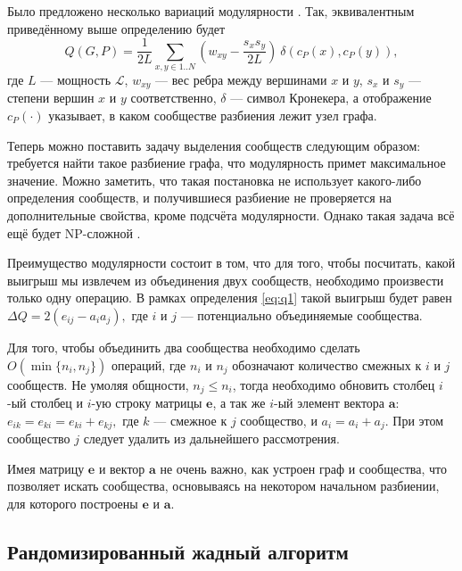 Было предложено несколько вариаций модулярности \cite{Muff&Rao&Caflisch:2005, Fortunato&Barthelemy:2007}. Так, эквивалентным приведённому выше определению будет
\begin{equation}
Q(G, P) = \frac{1}{2L} \sum_{x, y \in 1..N} \left(w_{xy} - \frac{s_x s_y}{2L}\right)\ \delta(c_P(x), c_P(y)),
\end{equation}
где $L$ --- мощность $\mathscr{L}$, $w_{xy}$ --- вес ребра между вершинами $x$ и $y$, $s_x$ и $s_y$ --- степени вершин $x$ и $y$ соответственно, $\delta$ --- символ Кронекера, а отображение $c_P(\cdot)$ указывает, в каком сообществе разбиения лежит узел графа.

Теперь можно поставить задачу выделения сообществ следующим образом: требуется найти такое разбиение графа, что модулярность примет максимальное значение. Можно заметить, что такая постановка не использует какого-либо определения сообществ, и получившиеся разбиение не проверяется на дополнительные свойства, кроме подсчёта модулярности. Однако такая задача всё ещё будет NP-сложной \cite{Brandes&al:2008}.

Преимущество модулярности состоит в том, что для того, чтобы посчитать, какой выигрыш мы извлечем из объединения двух сообществ, необходимо произвести только одну операцию. В рамках определения \eqref{eq:q1} такой выигрыш будет равен $\Delta Q = 2(e_{ij} - a_i a_j),$ где $i$ и $j$ --- потенциально объединяемые сообщества.

Для того, чтобы объединить два сообщества необходимо сделать $O(\min\{n_i, n_j\})$ операций, где $n_i$ и $n_j$ обозначают количество смежных к $i$ и $j$ сообществ. Не умоляя общности, $n_j \leq n_i$, тогда необходимо обновить столбец $i$-ый столбец и $i$-ую строку матрицы $\mathbf{e}$, а так же $i$-ый элемент вектора $\mathbf{a}$: $e_{ik} = e_{ki} = e_{ki} + e_{kj},$ где $k$ --- смежное к $j$ сообщество, и $a_{i} = a_{i} + a_{j}$. При этом сообщество $j$ следует удалить из дальнейшего рассмотрения.

Имея матрицу $\mathbf{e}$ и вектор $\mathbf{a}$ не очень важно, как устроен граф и сообщества, что позволяет искать сообщества, основываясь на некотором начальном разбиении, для которого построены $\mathbf{e}$ и $\mathbf{a}$.



\subsection{Рандомизированный жадный алгоритм}


